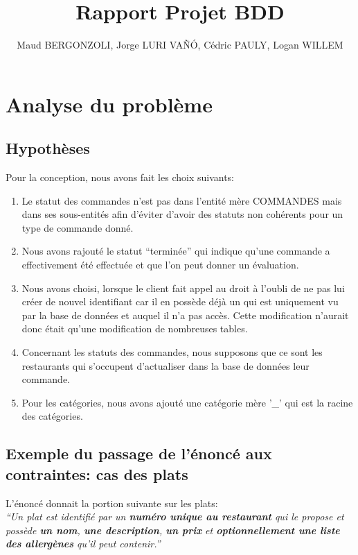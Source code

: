 \documentclass[10pt, a4paper]{article}
\title{Rapport Projet BDD}
\date{}
\author{Maud BERGONZOLI, Jorge LURI VAÑÓ, Cédric PAULY, Logan WILLEM}
\begin{document}
\maketitle
\tableofcontents
\newpage

\section{Analyse du problème}
\subsection{Hypothèses}
Pour la conception, nous avons fait les choix suivants:
\begin{enumerate}
    \item Le statut des commandes n'est pas dans l'entité mère COMMANDES
          mais dans ses sous-entités afin d'éviter d'avoir des statuts non cohérents
          pour un type de commande donné.
    \item Nous avons rajouté le statut ``terminée'' qui indique qu'une
          commande a effectivement été effectuée et que l'on peut donner un
          évaluation.
    \item Nous avons choisi, lorsque le client fait appel au droit à l'oubli de ne pas lui créer de nouvel identifiant car il en possède déjà
          un qui est uniquement vu par la base de données et auquel il n'a pas accès. Cette modification n'aurait donc était qu'une modification de nombreuses tables.
    \item Concernant les statuts des commandes, nous supposons que ce sont les restaurants qui s'occupent d'actualiser dans la base de données leur commande.
    \item Pour les catégories, nous avons ajouté une catégorie mère '\_' qui est la racine des catégories.
\end{enumerate}

\subsection{Exemple du passage de l'énoncé aux contraintes: cas des plats}
L'énoncé donnait la portion suivante sur les plats:
\\

\textit{``Un plat est identifié par un \textbf{numéro unique au restaurant} qui le propose et possède \textbf{un nom}, \textbf{une description},
\textbf{un prix} et \textbf{optionnellement une liste des allergènes} qu’il peut contenir.''}
\\
\end{document}
